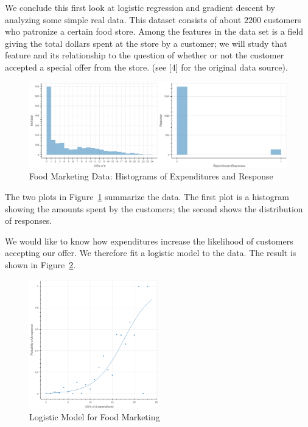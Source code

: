 \documentclass[
  11pt,
  letterpaper,
]{scrbook}
\theoremstyle{plain}
\theoremstyle{plain}
\theoremstyle{remark}
\begin{document}
We conclude this first look at logistic regression and gradient descent
by analyzing some simple real data. This dataset consists of about
\(2200\) customers who patronize a certain food store. Among the
features in the data set is a field giving the total dollars spent at
the store by a customer; we will study that feature and its relationship
to the question of whether or not the customer accepted a special offer
from the store. (see {[}4{]} for the original data source).

\begin{figure}

{\centering \includegraphics[width=1\textwidth,height=\textheight]{chapters/img/FoodDataPlot.png}

}

\caption{\label{fig-fooddataplot}Food Marketing Data: Histograms of
Expenditures and Response}

\end{figure}

The two plots in Figure~\ref{fig-fooddataplot} summarize the data. The
first plot is a histogram showing the amounts spent by the customers;
the second shows the distribution of responses.

We would like to know how expenditures increase the likelihood of
customers accepting our offer. We therefore fit a logistic model to the
data. The result is shown in Figure~\ref{fig-foodlogisticfit}.

\begin{figure}

{\centering \includegraphics[width=0.5\textwidth,height=\textheight]{chapters/img/FoodLogisticFit.png}

}

\caption{\label{fig-foodlogisticfit}Logistic Model for Food Marketing}

\end{figure}
\end{document}
